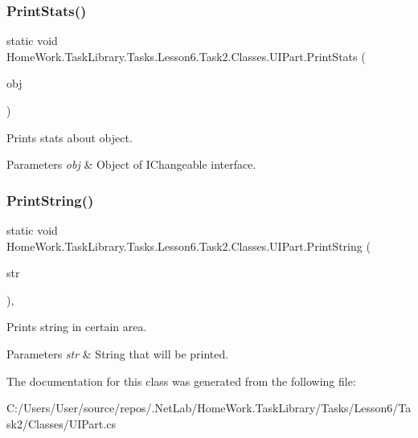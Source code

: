 \subsubsection{\texorpdfstring{PrintStats()}{PrintStats()}}
{\footnotesize\ttfamily static void Home\+Work.\+Task\+Library.\+Tasks.\+Lesson6.\+Task2.\+Classes.\+U\+I\+Part.\+Print\+Stats (\begin{DoxyParamCaption}\item[{\mbox{\hyperlink{interface_home_work_1_1_task_library_1_1_tasks_1_1_lesson6_1_1_task2_1_1_interfaces_1_1_i_changeable}{I\+Changeable}}}]{obj }\end{DoxyParamCaption})\hspace{0.3cm}{\ttfamily [static]}}



Prints stats about object. 


\begin{DoxyParams}{Parameters}
{\em obj} & Object of I\+Changeable interface.\\
\hline
\end{DoxyParams}
\mbox{\label{class_home_work_1_1_task_library_1_1_tasks_1_1_lesson6_1_1_task2_1_1_classes_1_1_u_i_part_a6eda37c969281ba05d1ce502be9a3544}} 
\subsubsection{\texorpdfstring{PrintString()}{PrintString()}}
{\footnotesize\ttfamily static void Home\+Work.\+Task\+Library.\+Tasks.\+Lesson6.\+Task2.\+Classes.\+U\+I\+Part.\+Print\+String (\begin{DoxyParamCaption}\item[{string}]{str }\end{DoxyParamCaption})\hspace{0.3cm}{\ttfamily [static]}, {\ttfamily [private]}}



Prints string in certain area. 


\begin{DoxyParams}{Parameters}
{\em str} & String that will be printed.\\
\hline
\end{DoxyParams}


The documentation for this class was generated from the following file\+:\begin{DoxyCompactItemize}
\item 
C\+:/\+Users/\+User/source/repos/.\+Net\+Lab/\+Home\+Work.\+Task\+Library/\+Tasks/\+Lesson6/\+Task2/\+Classes/U\+I\+Part.\+cs\end{DoxyCompactItemize}
